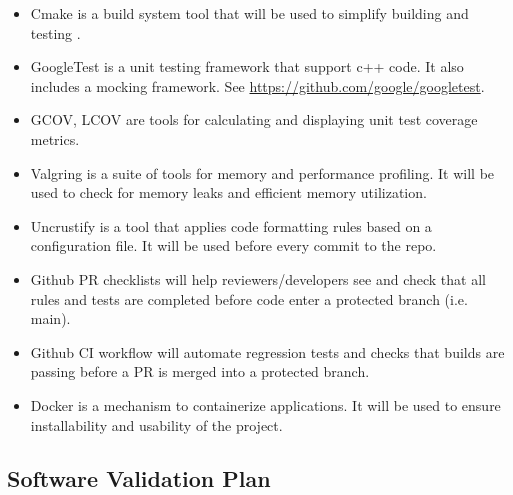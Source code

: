 \documentclass[12pt, titlepage]{article}
\begin{document}
\begin{itemize}
    \item Cmake \citep{cmake} is a build system tool that will be used to simplify building and testing \progname{}.
    \item GoogleTest is a unit testing framework that support c++ code. It also includes a mocking framework. See \url{https://github.com/google/googletest}.
    \item GCOV, LCOV are tools for calculating and displaying unit test coverage metrics.
    \item Valgring is a suite of tools for memory and performance profiling. It will be used to check for memory leaks and efficient memory utilization.
    \item Uncrustify is a tool that applies code formatting rules based on a configuration file. It will be used before every commit to the repo.
    \item Github PR checklists will help reviewers/developers see and check that all rules and tests are completed before code enter a protected branch (i.e. main).
    \item Github CI workflow will automate regression tests and checks that \progname{} builds are passing before a PR is merged into a protected branch.
    \item Docker is a mechanism to containerize applications. It will be used to ensure installability and usability of the project.
\end{itemize}




\subsection{Software Validation Plan}
\end{document}
